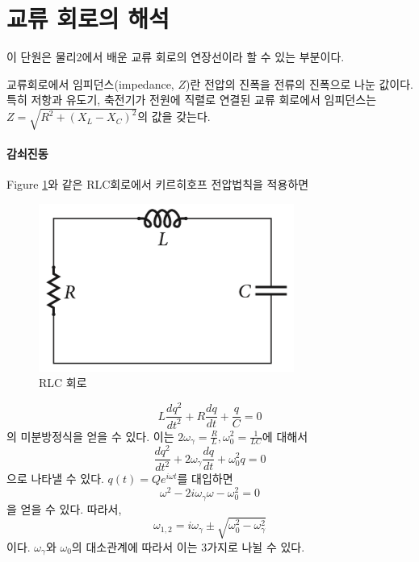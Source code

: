 \section{교류 회로의 해석}
이 단원은 물리2에서 배운 교류 회로의 연장선이라 할 수 있는 부분이다.
\begin{remark}
교류회로에서 임피던스(impedance, $Z$)란 전압의 진폭을 전류의 진폭으로 나눈 값이다. 특히 저항과 유도기, 축전기가 전원에 직렬로 연결된 교류 회로에서 임피던스는 $Z=\sqrt{R^2+(X_L-X_C)^2}$의 값을 갖는다.
\end{remark}


\paragraph{감쇠진동}
Figure \ref{fig:damped}와 같은 RLC회로에서 키르히호프 전압법칙을 적용하면 
\begin{figure}[h]
\centering\includegraphics[scale=0.6]{Pictures/damped.PNG}
\caption{RLC 회로}
\label{fig:damped}
\end{figure}
\begin{equation}
L\frac{dq^2}{dt^2}+R\frac{dq}{dt}+\frac{q}{C}=0\label{eq:RLC}
\end{equation}
의 미분방정식을 얻을 수 있다. 이는 $2\omega_\gamma=\frac{R}{L}, \omega_0^2=\frac{1}{LC}$에 대해서
\begin{equation}
\frac{dq^2}{dt^2}+2\omega_\gamma \frac{dq}{dt}+\omega_0^2q=0
\end{equation}
으로 나타낼 수 있다. $q(t)=Qe^{i\omega t}$를 대입하면
\begin{equation}
\omega^2 -2i\omega_\gamma \omega -\omega_0^2=0
\end{equation}
을 얻을 수 있다. 따라서, 
\begin{equation}
\omega_{1,2}=i\omega_\gamma\pm \sqrt{\omega_0^2 -\omega_\gamma^2}
\end{equation}
이다. $\omega_\gamma$와 $\omega_0$의 대소관계에 따라서 이는 3가지로 나뉠 수 있다.
